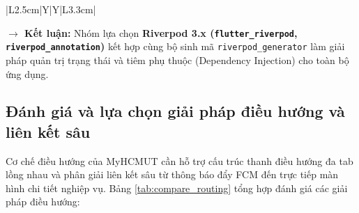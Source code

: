 \begin{table}[H]
\begin{tabularx}{\textwidth}{|L{2.5cm}|Y|Y|L{3.3cm}|}
    \hline
    \end{tabularx}
    \caption{\textit{Bảng so sánh các giải pháp quản trị trạng thái trong Flutter}}
    \label{tab:compare_state_management}
\end{table}

\noindent \textbf{$\rightarrow$ Kết luận:} Nhóm lựa chọn \textbf{Riverpod 3.x (\texttt{flutter\_\allowbreak riverpod}, \texttt{riverpod\_\allowbreak annotation})} kết hợp cùng bộ sinh mã \texttt{riverpod\_generator} làm giải pháp quản trị trạng thái và tiêm phụ thuộc (Dependency Injection) cho toàn bộ ứng dụng.

\subsection{Đánh giá và lựa chọn giải pháp điều hướng và liên kết sâu}
\label{subsec:compare_routing}

Cơ chế điều hướng của MyHCMUT cần hỗ trợ cấu trúc thanh điều hướng đa tab lồng nhau và phân giải liên kết sâu từ thông báo đẩy FCM đến trực tiếp màn hình chi tiết nghiệp vụ. Bảng \ref{tab:compare_routing} tổng hợp đánh giá các giải pháp điều hướng:

